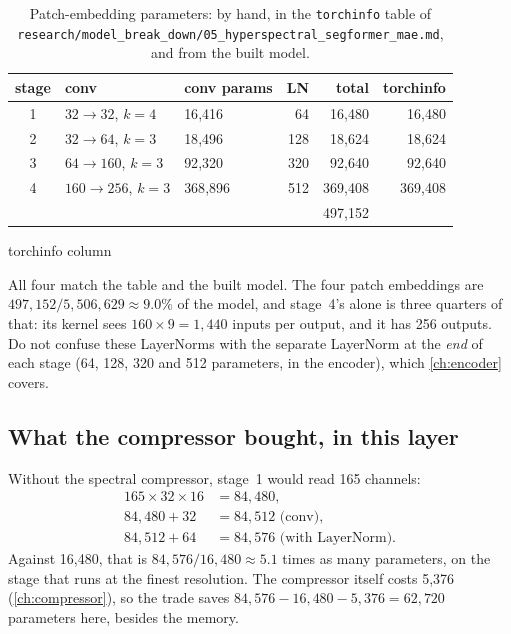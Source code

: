 \begin{table}[htbp]\centering\small
\caption{Patch-embedding parameters: by hand, in the \texttt{torchinfo} table of
\texttt{research/model\_break\_down/05\_hyperspectral\_segformer\_mae.md}, and from the built model.}
\label{tab:patchembed:count}
\begin{tabular}{cllrrr}
\toprule
stage & conv & conv params & LN & total & torchinfo\\
\midrule
1 & $32\to32$, $k=4$ & 16{,}416 & 64 & 16{,}480 & 16{,}480\\
2 & $32\to64$, $k=3$ & 18{,}496 & 128 & 18{,}624 & 18{,}624\\
3 & $64\to160$, $k=3$ & 92{,}320 & 320 & 92{,}640 & 92{,}640\\
4 & $160\to256$, $k=3$ & 368{,}896 & 512 & 369{,}408 & 369{,}408\\
\midrule
& & & & 497{,}152 & \\
\bottomrule
\end{tabular}

\smallskip
torchinfo column
\end{table}

All four match the  table and the built model\tagC. The four patch embeddings are $497{,}152/5{,}506{,}629 \approx 9.0\%$ of the
model, and stage~4's alone is three quarters of that: its kernel sees $160\times9 = 1{,}440$ inputs per
output, and it has 256 outputs. Do not confuse these LayerNorms with the separate LayerNorm at the
\emph{end} of each stage (64, 128, 320 and 512 parameters,  in the encoder), which
\cref{ch:encoder} covers.

\subsection{What the compressor bought, in this layer}

Without the spectral compressor, stage~1 would read 165 channels:
\begin{align*}
165\times32\times16 &= 84{,}480,\\
84{,}480 + 32 &= 84{,}512 \text{ (conv)},\\
84{,}512 + 64 &= 84{,}576 \text{ (with LayerNorm)}.
\end{align*}
Against 16{,}480, that is $84{,}576/16{,}480 \approx 5.1$ times as many parameters, on the stage that
runs at the finest resolution\tagC. The compressor itself costs 5{,}376 (\cref{ch:compressor}), so the
trade saves $84{,}576 - 16{,}480 - 5{,}376 = 62{,}720$ parameters here, besides the memory.

